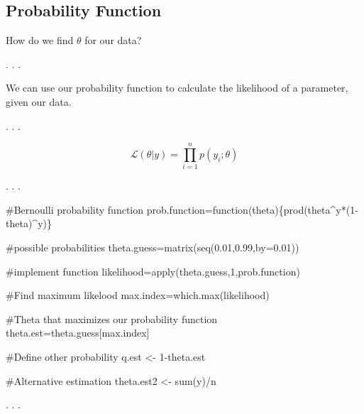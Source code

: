 \documentclass[
  letterpaper,
  DIV=11,
  numbers=noendperiod]{scrartcl}
\newenvironment{Shaded}{\begin{snugshade}}{\end{snugshade}}
\newcommand{\AttributeTok}[1]{\textcolor[rgb]{0.40,0.45,0.13}{#1}}
\newcommand{\CommentTok}[1]{\textcolor[rgb]{0.37,0.37,0.37}{#1}}
\newcommand{\ControlFlowTok}[1]{\textcolor[rgb]{0.00,0.23,0.31}{#1}}
\newcommand{\DecValTok}[1]{\textcolor[rgb]{0.68,0.00,0.00}{#1}}
\newcommand{\FloatTok}[1]{\textcolor[rgb]{0.68,0.00,0.00}{#1}}
\newcommand{\FunctionTok}[1]{\textcolor[rgb]{0.28,0.35,0.67}{#1}}
\newcommand{\NormalTok}[1]{\textcolor[rgb]{0.00,0.23,0.31}{#1}}
\newcommand{\OtherTok}[1]{\textcolor[rgb]{0.00,0.23,0.31}{#1}}
\newcommand{\SpecialCharTok}[1]{\textcolor[rgb]{0.37,0.37,0.37}{#1}}
\begin{document}
\hypertarget{probability-function-2}{%
\subsection{Probability Function}\label{probability-function-2}}

How do we find \(\theta\) for our data?

. . .

We can use our probability function to calculate the likelihood of a
parameter, given our data.

. . .

\[
\mathcal{L}(\theta|y) = \prod_{i=1}^{n} p(y_{i};\theta)
\]

. . .

\begin{Shaded}
\begin{Highlighting}[numbers=left,,]
\CommentTok{\#Bernoulli probability function}
\NormalTok{  prob.function}\OtherTok{=}\ControlFlowTok{function}\NormalTok{(theta)\{}\FunctionTok{prod}\NormalTok{(theta}\SpecialCharTok{\^{}}\NormalTok{y}\SpecialCharTok{*}\NormalTok{(}\DecValTok{1}\SpecialCharTok{{-}}\NormalTok{theta)}\SpecialCharTok{\^{}}\NormalTok{y)\}}

\CommentTok{\#possible probabilities}
\NormalTok{  theta.guess}\OtherTok{=}\FunctionTok{matrix}\NormalTok{(}\FunctionTok{seq}\NormalTok{(}\FloatTok{0.01}\NormalTok{,}\FloatTok{0.99}\NormalTok{,}\AttributeTok{by=}\FloatTok{0.01}\NormalTok{))}

\CommentTok{\#implement function}
\NormalTok{  likelihood}\OtherTok{=}\FunctionTok{apply}\NormalTok{(theta.guess,}\DecValTok{1}\NormalTok{,prob.function)}
  
\CommentTok{\#Find maximum likelood}
\NormalTok{  max.index}\OtherTok{=}\FunctionTok{which.max}\NormalTok{(likelihood)}

\CommentTok{\#Theta that maximizes our probability function}
\NormalTok{  theta.est}\OtherTok{=}\NormalTok{theta.guess[max.index]}

\CommentTok{\#Define other probability}
\NormalTok{  q.est }\OtherTok{\textless{}{-}} \DecValTok{1}\SpecialCharTok{{-}}\NormalTok{theta.est}

\CommentTok{\#Alternative estimation}
\NormalTok{  theta.est2 }\OtherTok{\textless{}{-}} \FunctionTok{sum}\NormalTok{(y)}\SpecialCharTok{/}\NormalTok{n}
\end{Highlighting}
\end{Shaded}

. . .
\end{document}
